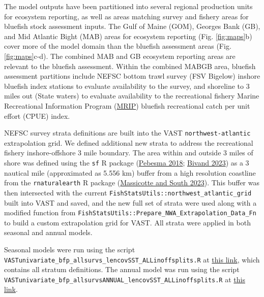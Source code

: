 \documentclass[
]{article}
\begin{document}
The model outputs have been partitioned into several regional production units for ecosystem reporting, as well as areas matching survey and fishery areas for bluefish stock assessment inputs. The Gulf of Maine (GOM), Georges Bank (GB), and Mid Atlantic Bight (MAB) areas for ecosystem reporting (Fig. \ref{fig:maps}b) cover more of the model domain than the bluefish assessment areas (Fig. \ref{fig:maps}c-d). The combined MAB and GB ecosystem reporting areas are relevant to the bluefish assessment. Within the combined MABGB area, bluefish assessment partitions include NEFSC bottom trawl survey (FSV Bigelow) inshore bluefish index stations to evaluate availability to the survey, and shoreline to 3 miles out (State waters) to evaluate availability to the recreational fishery Marine Recreational Information Program (\href{https://www.fisheries.noaa.gov/recreational-fishing-data/about-marine-recreational-information-program}{MRIP}) bluefish recreational catch per unit effort (CPUE) index.

NEFSC survey strata definitions are built into the VAST \texttt{northwest-atlantic} extrapolation grid. We defined additional new strata to address the recreational fishery inshore-offshore 3 mile boundary. The area within and outside 3 miles of shore was defined using the \texttt{sf} R package (\protect\hyperlink{ref-pebesma_simple_2018}{Pebesma 2018}; \protect\hyperlink{ref-bivand_spatial_2023}{Bivand 2023}) as a 3 nautical mile (approximated as 5.556 km) buffer from a high resolution coastline from the \texttt{rnaturalearth} R package (\protect\hyperlink{ref-massicotte_rnaturalearth_2023}{Massicotte and South 2023}). This buffer was then intersected with the current \texttt{FishStatsUtils::northwest\_atlantic\_grid} built into VAST and saved, and the new full set of strata were used along with a modified function from \texttt{FishStatsUtils::Prepare\_NWA\_Extrapolation\_Data\_Fn} to build a custom extrapolation grid for VAST. All strata were applied in both seasonal and annual models.

Seasonal models were run using the script \texttt{VASTunivariate\_bfp\_allsurvs\_lencovSST\_ALLinoffsplits.R} at \href{https://github.com/NOAA-EDAB/forageindex/blob/main/VASTscripts/VASTunivariate_bfp_allsurvs_lencovSST_ALLinoffsplits.R}{this link}, which contains all stratum definitions. The annual model was run using the script \texttt{VASTunivariate\_bfp\_allsurvsANNUAL\_lencovSST\_ALLinoffsplits.R} at \href{https://github.com/NOAA-EDAB/forageindex/blob/main/VASTscripts/VASTunivariate_bfp_allsurvsANNUAL_lencovSST_ALLinoffsplits.R}{this link}.
\end{document}
